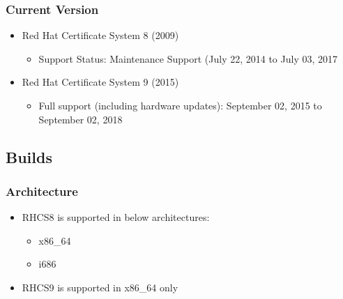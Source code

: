 \documentclass[12pt]{report}
\begin{document}
    \subsubsection{Current Version}
        \begin{itemize}
            \item Red Hat Certificate System 8 (2009) 
                \begin{itemize}
                    \item Support Status: Maintenance Support (July 22, 2014 to July 03, 2017
                \end{itemize}
            \item Red Hat Certificate System 9 (2015)
                \begin{itemize}
                    \item Full support (including hardware updates): September 02, 2015 to September 02, 2018
                \end{itemize}
        \end{itemize}
\subsection{Builds}
    \subsubsection{Architecture}
        \begin{itemize}
            \item RHCS8 is supported in below architectures:
                \begin{itemize}
                    \item x86\_64
                    \item i686
                \end{itemize}
            \item RHCS9 is supported in x86\_64 only
        \end{itemize}
\end{document}
